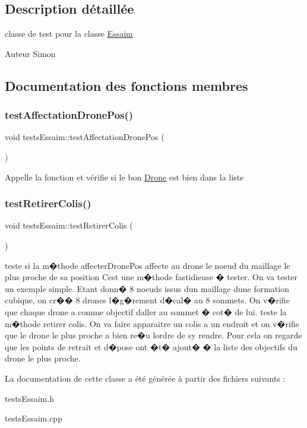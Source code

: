 \subsection{Description détaillée}
classe de test pour la classe \mbox{\hyperlink{class_essaim}{Essaim}} \begin{DoxyAuthor}{Auteur}
Simon 
\end{DoxyAuthor}


\subsection{Documentation des fonctions membres}
\mbox{\label{classtests_essaim_a602aca58210132a947410123c130665e}} 
\subsubsection{\texorpdfstring{test\+Affectation\+Drone\+Pos()}{testAffectationDronePos()}}
{\footnotesize\ttfamily void tests\+Essaim\+::test\+Affectation\+Drone\+Pos (\begin{DoxyParamCaption}{ }\end{DoxyParamCaption})\hspace{0.3cm}{\ttfamily [protected]}}

Appelle la fonction et vérifie si le bon \mbox{\hyperlink{class_drone}{Drone}} est bien dans la liste \mbox{\label{classtests_essaim_ac6af8267d8e85120a6b1e5b66b247f5b}} 
\subsubsection{\texorpdfstring{test\+Retirer\+Colis()}{testRetirerColis()}}
{\footnotesize\ttfamily void tests\+Essaim\+::test\+Retirer\+Colis (\begin{DoxyParamCaption}{ }\end{DoxyParamCaption})\hspace{0.3cm}{\ttfamily [protected]}}

teste si la m�thode affecter\+Drone\+Pos affecte au drone le noeud du maillage le plus proche de sa position C\textquotesingle{}est une m�thode fastidieuse � tester. On va tester un exemple simple. Etant donn� 8 noeuds issus d\textquotesingle{}un maillage d\textquotesingle{}une formation cubique, on cr�� 8 drones l�g�rement d�cal� au 8 sommets. On v�rifie que chaque drone a comme objectif d\textquotesingle{}aller au sommet � cot� de lui. teste la m�thode retirer colis. On va faire apparaitre un colis a un endroit et on v�rifie que le drone le plus proche a bien re�u l\textquotesingle{}ordre de s\textquotesingle{}y rendre. Pour cela on regarde que les points de retrait et d�pose ont �t� ajout� � la liste des objectifs du drone le plus proche. 

La documentation de cette classe a été générée à partir des fichiers suivants \+:\begin{DoxyCompactItemize}
\item 
tests\+Essaim.\+h\item 
tests\+Essaim.\+cpp\end{DoxyCompactItemize}
